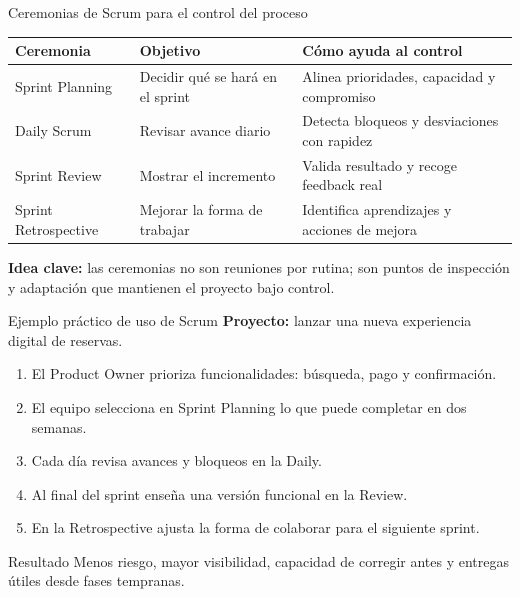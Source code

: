\documentclass{beamer}
\begin{document}
\begin{frame}{Ceremonias de Scrum para el control del proceso}
\small
\begin{tabularx}{\textwidth}{>{\RaggedRight\arraybackslash}p{} >{\RaggedRight\arraybackslash}p{} X}
\toprule
\textbf{Ceremonia} & \textbf{Objetivo} & \textbf{Cómo ayuda al control} \\
\midrule
Sprint Planning & Decidir qué se hará en el sprint & Alinea prioridades, capacidad y compromiso \\
Daily Scrum & Revisar avance diario & Detecta bloqueos y desviaciones con rapidez \\
Sprint Review & Mostrar el incremento & Valida resultado y recoge feedback real \\
Sprint Retrospective & Mejorar la forma de trabajar & Identifica aprendizajes y acciones de mejora \\
\bottomrule
\end{tabularx}

\vspace{0.25cm}
\normalsize
\textbf{Idea clave:} las ceremonias no son reuniones por rutina; son puntos de inspección y adaptación que mantienen el proyecto bajo control.
\end{frame}

\begin{frame}{Ejemplo práctico de uso de Scrum}
\textbf{Proyecto:} lanzar una nueva experiencia digital de reservas.

\vspace{0.2cm}
\begin{enumerate}
    \item El Product Owner prioriza funcionalidades: búsqueda, pago y confirmación.
    \item El equipo selecciona en Sprint Planning lo que puede completar en dos semanas.
    \item Cada día revisa avances y bloqueos en la Daily.
    \item Al final del sprint enseña una versión funcional en la Review.
    \item En la Retrospective ajusta la forma de colaborar para el siguiente sprint.
\end{enumerate}

\vspace{0.25cm}
\begin{alertblock}{Resultado}
Menos riesgo, mayor visibilidad, capacidad de corregir antes y entregas útiles desde fases tempranas.
\end{alertblock}
\end{frame}
\end{document}
